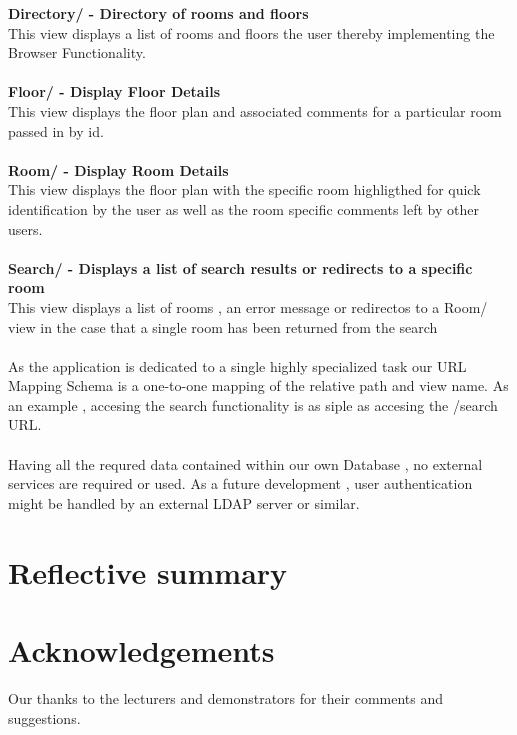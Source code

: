 \documentclass{sig-alt-release2}
\begin{document}
\textbf{Directory/ - Directory of rooms and floors}\\
This view displays a list of rooms and floors the user thereby  implementing the Browser Functionality.\\
\\     
\textbf{Floor/ - Display Floor Details}\\
This view  displays the floor plan and associated comments for a particular room passed in by id.\\
\\              
\textbf{Room/ - Display Room Details}\\
This view  displays the floor plan with the specific room
highligthed for quick identification by the user as well as the
room specific comments left by other users.\\
\\
\textbf{Search/ - Displays a list of search results or redirects to a specific room}\\
This view displays a list of rooms , an error message or redirectos to
 a Room/ view in the case that a single room has been returned from the search\\
\\ 
                                          
As the application is dedicated to a single highly specialized task our URL Mapping Schema
is a one-to-one mapping of the relative path and view name. As an example , accesing the 
search functionality is as siple as accesing the /search URL.\\
\\                                        
Having all the requred data contained within our own Database , no external services are required or used.
As a future development , user authentication might be handled by an external LDAP server or similar.

\section{Reflective summary}



\section{Acknowledgements}
Our thanks to the lecturers and demonstrators for their comments and suggestions.
\end{document}
